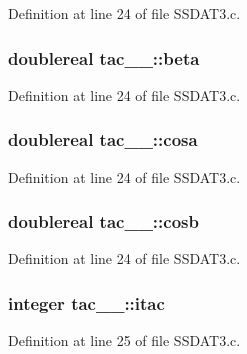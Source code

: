 Definition at line 24 of file S\+S\+D\+A\+T3.\+c.

\subsubsection[{\texorpdfstring{beta}{beta}}]{\setlength{\rightskip}{0pt plus 5cm}doublereal tac\+\_\+\_\+\+::beta}\hypertarget{structtac__1___aaaab619f46670370c9fb7d5983929a27}{}\label{structtac__1___aaaab619f46670370c9fb7d5983929a27}


Definition at line 24 of file S\+S\+D\+A\+T3.\+c.

\subsubsection[{\texorpdfstring{cosa}{cosa}}]{\setlength{\rightskip}{0pt plus 5cm}doublereal tac\+\_\+\_\+\+::cosa}\hypertarget{structtac__1___a653f85db2c4bb50a53f554702b04b75d}{}\label{structtac__1___a653f85db2c4bb50a53f554702b04b75d}


Definition at line 24 of file S\+S\+D\+A\+T3.\+c.

\subsubsection[{\texorpdfstring{cosb}{cosb}}]{\setlength{\rightskip}{0pt plus 5cm}doublereal tac\+\_\+\_\+\+::cosb}\hypertarget{structtac__1___a408943828988ff737eb55941ebd501fc}{}\label{structtac__1___a408943828988ff737eb55941ebd501fc}


Definition at line 24 of file S\+S\+D\+A\+T3.\+c.

\subsubsection[{\texorpdfstring{itac}{itac}}]{\setlength{\rightskip}{0pt plus 5cm}integer tac\+\_\+\_\+\+::itac}\hypertarget{structtac__1___a9ff5dc2371992d00536ac9c6e6244a3b}{}\label{structtac__1___a9ff5dc2371992d00536ac9c6e6244a3b}


Definition at line 25 of file S\+S\+D\+A\+T3.\+c.

